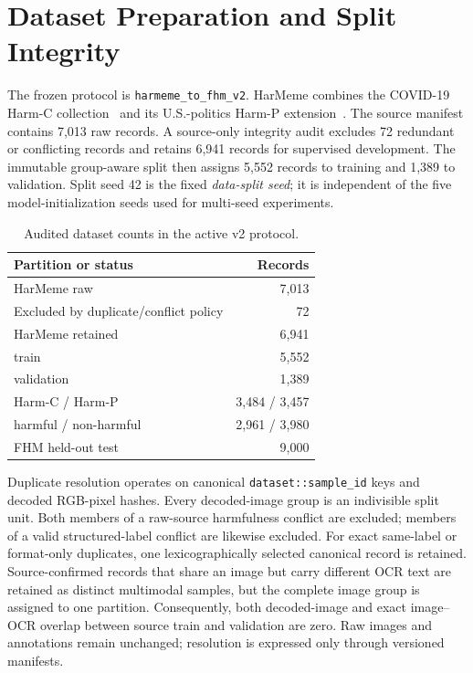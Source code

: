 \section{Dataset Preparation and Split Integrity}
\label{sec:supp:data}

The frozen protocol is \texttt{harmeme\_to\_fhm\_v2}.  HarMeme combines the
COVID-19 Harm-C collection~\cite{pramanick2021harmeme} and its U.S.-politics
Harm-P extension~\cite{pramanick2021momenta}.  The source manifest contains
7,013 raw records.  A source-only integrity audit excludes 72 redundant or
conflicting records and retains 6,941 records for supervised development.
The immutable group-aware split then assigns 5,552 records to training and
1,389 to validation.  Split seed 42 is the fixed \emph{data-split seed}; it
is independent of the five model-initialization seeds used for multi-seed
experiments.

\begin{table}[h]
  \caption{Audited dataset counts in the active v2 protocol.}
  \label{tab:supp:dataset-counts}
  \centering
  \begin{tabular}{@{}lr@{}}
    \toprule
    Partition or status & Records \\
    \midrule
    HarMeme raw & 7,013 \\
    Excluded by duplicate/conflict policy & 72 \\
    HarMeme retained & 6,941 \\
    \quad train & 5,552 \\
    \quad validation & 1,389 \\
    \quad Harm-C / Harm-P & 3,484 / 3,457 \\
    \quad harmful / non-harmful & 2,961 / 3,980 \\
    FHM held-out test & 9,000 \\
    \bottomrule
  \end{tabular}
\end{table}

Duplicate resolution operates on canonical \nolinkurl{dataset::sample_id}
keys and decoded RGB-pixel hashes.  Every decoded-image group is an
indivisible split unit.  Both members of a raw-source harmfulness conflict
are excluded; members of a valid structured-label conflict are likewise
excluded.  For exact same-label or format-only duplicates, one
lexicographically selected canonical record is retained.  Source-confirmed
records that share an image but carry different OCR text are retained as
distinct multimodal samples, but the complete image group is assigned to one
partition.  Consequently, both decoded-image and exact image--OCR overlap
between source train and validation are zero.  Raw images and annotations
remain unchanged; resolution is expressed only through versioned manifests.

